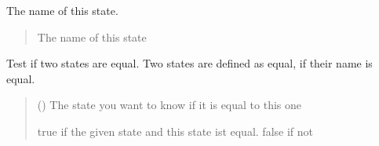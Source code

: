 \documentclass[letterpaper,10pt,english]{sphinxmanual}
\begin{document}
\begin{fulllineitems}
\begin{fulllineitems}
\end{fulllineitems}


\begin{fulllineitems}
\label{\detokenize{apidoc/src.osm_configurator.view.states:src.osm_configurator.view.states.state.State.get_state_name}}
\pysigstartsignatures
{}
\pysigstopsignatures
\sphinxAtStartPar
The name of this state.
\begin{quote}\begin{description}
\sphinxAtStartPar
The name of this state

\sphinxAtStartPar
{\hyperref[\detokenize{apidoc/src.osm_configurator.view.states:src.osm_configurator.view.states.state_name_enum.StateName}]{}}

\end{description}\end{quote}

\end{fulllineitems}


\begin{fulllineitems}
\label{\detokenize{apidoc/src.osm_configurator.view.states:src.osm_configurator.view.states.state.State.equals}}
\pysigstartsignatures
{}
\pysigstopsignatures
\sphinxAtStartPar
Test if two states are equal.
Two states are defined as equal, if their name is equal.
\begin{quote}\begin{description}
\sphinxAtStartPar
{} ({\hyperref[\detokenize{apidoc/src.osm_configurator.view.states:src.osm_configurator.view.states.state.State}]{}}) \textendash{} The state you want to know if it is equal to this one

\sphinxAtStartPar
true if the given state and this state ist equal. false if not

\sphinxAtStartPar
{}

\end{description}\end{quote}

\end{fulllineitems}


\end{fulllineitems}
\end{document}
